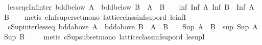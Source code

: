 \begin{isabellebody}
\ less{\isacharunderscore}{\kern0pt}eq{\isacharunderscore}{\kern0pt}cInf{\isacharunderscore}{\kern0pt}inter{\isacharcolon}{\kern0pt}\ {\isachardoublequoteopen}bdd{\isacharunderscore}{\kern0pt}below\ A\ {\isasymLongrightarrow}\ bdd{\isacharunderscore}{\kern0pt}below\ B\ {\isasymLongrightarrow}\ A\ {\isasyminter}\ B\ {\isasymnoteq}\ {\isacharbraceleft}{\kern0pt}{\isacharbraceright}{\kern0pt}\ {\isasymLongrightarrow}\ inf\ {\isacharparenleft}{\kern0pt}Inf\ A{\isacharparenright}{\kern0pt}\ {\isacharparenleft}{\kern0pt}Inf\ B{\isacharparenright}{\kern0pt}\ {\isasymle}\ Inf\ {\isacharparenleft}{\kern0pt}A\ {\isasyminter}\ B{\isacharparenright}{\kern0pt}{\isachardoublequoteclose}\isanewline
%
\isadelimproof
\ \ %
\endisadelimproof
%
\isatagproof
{}\isamarkupfalse%
\ {\isacharparenleft}{\kern0pt}metis\ cInf{\isacharunderscore}{\kern0pt}superset{\isacharunderscore}{\kern0pt}mono\ lattice{\isacharunderscore}{\kern0pt}class{\isachardot}{\kern0pt}inf{\isacharunderscore}{\kern0pt}sup{\isacharunderscore}{\kern0pt}ord{\isacharparenleft}{\kern0pt}{}{\isacharparenright}{\kern0pt}\ le{\isacharunderscore}{\kern0pt}infI{}{\isacharparenright}{\kern0pt}%
\endisatagproof
{\isafoldproof}%
%
\isadelimproof
\isanewline
%
\endisadelimproof
\isanewline
{}\isamarkupfalse%
\ cSup{\isacharunderscore}{\kern0pt}inter{\isacharunderscore}{\kern0pt}less{\isacharunderscore}{\kern0pt}eq{\isacharcolon}{\kern0pt}\ {\isachardoublequoteopen}bdd{\isacharunderscore}{\kern0pt}above\ A\ {\isasymLongrightarrow}\ bdd{\isacharunderscore}{\kern0pt}above\ B\ {\isasymLongrightarrow}\ A\ {\isasyminter}\ B\ {\isasymnoteq}\ {\isacharbraceleft}{\kern0pt}{\isacharbraceright}{\kern0pt}\ {\isasymLongrightarrow}\ Sup\ {\isacharparenleft}{\kern0pt}A\ {\isasyminter}\ B{\isacharparenright}{\kern0pt}\ {\isasymle}\ sup\ {\isacharparenleft}{\kern0pt}Sup\ A{\isacharparenright}{\kern0pt}\ {\isacharparenleft}{\kern0pt}Sup\ B{\isacharparenright}{\kern0pt}\ {\isachardoublequoteclose}\isanewline
%
\isadelimproof
\ \ %
\endisadelimproof
%
\isatagproof
{}\isamarkupfalse%
\ {\isacharparenleft}{\kern0pt}metis\ cSup{\isacharunderscore}{\kern0pt}subset{\isacharunderscore}{\kern0pt}mono\ lattice{\isacharunderscore}{\kern0pt}class{\isachardot}{\kern0pt}inf{\isacharunderscore}{\kern0pt}sup{\isacharunderscore}{\kern0pt}ord{\isacharparenleft}{\kern0pt}{}{\isacharparenright}{\kern0pt}\ le{\isacharunderscore}{\kern0pt}supI{}{\isacharparenright}{\kern0pt}%
\endisatagproof
{\isafoldproof}%
%
\isadelimproof
\isanewline
%
\endisadelimproof
\isanewline
{}\isamarkupfalse%

\end{isabellebody}
